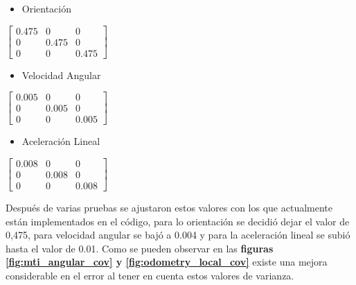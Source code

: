\begin{itemize}
  \item Orientación
\end{itemize}

$\begin{bmatrix}
  0.475 & 0 & 0\\
  0 & 0.475 & 0\\
  0 & 0 & 0.475
\end{bmatrix}$

\begin{itemize}
  \item Velocidad Angular
\end{itemize}

$\begin{bmatrix}
  0.005 & 0 & 0\\
  0 & 0.005 & 0\\
  0 & 0 & 0.005
\end{bmatrix}$


\begin{itemize}
  \item Aceleración Lineal
\end{itemize}

$\begin{bmatrix}
  0.008 & 0 & 0\\
  0 & 0.008 & 0\\
  0 & 0 & 0.008
\end{bmatrix}$

Después de varias pruebas se ajustaron estos valores con los que actualmente están implementados en el código, para lo orientación se decidió dejar el valor de 0,475, para velocidad angular se bajó a 0.004 y para la aceleración lineal se subió hasta 
el valor de 0.01. Como se pueden observar en las \textbf{figuras \ref{fig:mti_angular_cov} y \ref{fig:odometry_local_cov}} existe una mejora considerable en el error al tener en cuenta estos valores de varianza.

